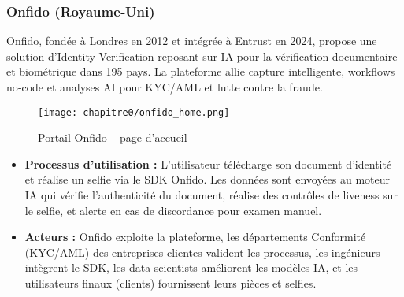 \subsubsection{Onfido (Royaume‑Uni)}
Onfido\cite{b4,b36}, fondée à Londres en 2012 et intégrée à Entrust en 2024\cite{b37}, propose une solution d’Identity Verification reposant sur IA pour la vérification documentaire et biométrique dans 195 pays\cite{b36}. La plateforme allie capture intelligente, workflows no‑code et analyses AI pour KYC/AML et lutte contre la fraude\cite{b36}.\\
\begin{figure}[H]
  \centering
  \texttt{[image: chapitre0/onfido\_home.png]}
  \caption{Portail Onfido – page d’accueil}
\end{figure}
\begin{itemize}[label=\textbullet]
  \item \textbf{Processus d'utilisation :} L’utilisateur télécharge son document d’identité et réalise un selfie via le SDK Onfido\cite{b38}. Les données sont envoyées au moteur IA qui vérifie l’authenticité du document, réalise des contrôles de liveness sur le selfie, et alerte en cas de discordance pour examen manuel\cite{b37}.
  \item \textbf{Acteurs :} Onfido exploite la plateforme, les départements Conformité (KYC/AML) des entreprises clientes valident les processus, les ingénieurs intègrent le SDK, les data scientists améliorent les modèles IA, et les utilisateurs finaux (clients) fournissent leurs pièces et selfies\cite{b39}.
\end{itemize}

